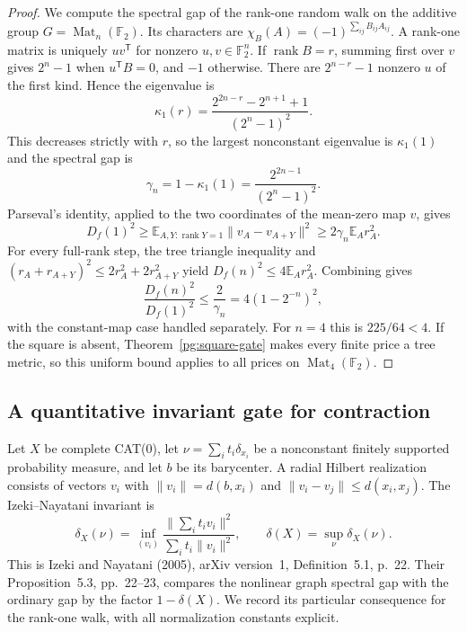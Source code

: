 \begin{proof}
We compute the spectral gap of the rank-one random walk on the additive
group $G=\operatorname{Mat}_n(\mathbb F_2)$. Its characters are
$\chi_B(A)=(-1)^{\sum_{ij}B_{ij}A_{ij}}$. A rank-one matrix is uniquely
$uv^{\mathsf T}$ for nonzero $u,v\in\mathbb F_2^n$. If
$\operatorname{rank}B=r$, summing first over $v$ gives $2^n-1$ when
$u^{\mathsf T}B=0$, and $-1$ otherwise. There are
$2^{n-r}-1$ nonzero $u$ of the first kind. Hence the eigenvalue is
\[
 \kappa_1(r)
 =\frac{2^{2n-r}-2^{n+1}+1}{(2^n-1)^2}.
\]
This decreases strictly with $r$, so the largest nonconstant eigenvalue
is $\kappa_1(1)$ and the spectral gap is
\[
 \gamma_n=1-\kappa_1(1)
 =\frac{2^{2n-1}}{(2^n-1)^2}.
\]
Parseval's identity, applied to the two coordinates of the mean-zero map
$v$, gives
\[
 D_f(1)^2\geq\mathbb E_{A,Y:\operatorname{rank}Y=1}
 \|v_A-v_{A+Y}\|^2
 \geq2\gamma_n\mathbb E_A r_A^2.
\]
For every full-rank step, the tree triangle inequality and
$(r_A+r_{A+Y})^2\leq2r_A^2+2r_{A+Y}^2$ yield
$D_f(n)^2\leq4\mathbb E_A r_A^2$. Combining gives
\[
 \frac{D_f(n)^2}{D_f(1)^2}
 \leq\frac{2}{\gamma_n}
 =4(1-2^{-n})^2,
\]
with the constant-map case handled separately. For $n=4$ this is
$225/64<4$. If the square is absent, Theorem~\ref{pg:square-gate}
makes every finite price a tree metric, so this uniform bound applies to
all prices on $\operatorname{Mat}_4(\mathbb F_2)$.
\end{proof}

\subsection{A quantitative invariant gate for contraction}

Let $X$ be complete CAT(0), let $\nu=\sum_i t_i\delta_{x_i}$ be a
nonconstant finitely supported probability measure, and let $b$ be its
barycenter. A radial Hilbert realization consists of vectors $v_i$ with
$\|v_i\|=d(b,x_i)$ and $\|v_i-v_j\|\leq d(x_i,x_j)$. The
Izeki--Nayatani invariant is
\[
 \delta_X(\nu)=\inf_{(v_i)}
 \frac{\|\sum_i t_i v_i\|^2}{\sum_i t_i\|v_i\|^2},
 \qquad \delta(X)=\sup_\nu\delta_X(\nu).
\]
This is Izeki and Nayatani (2005), arXiv version~1,
Definition~5.1, p.~22. Their Proposition~5.3, pp.~22--23,
compares the nonlinear graph spectral gap with the ordinary gap by the
factor $1-\delta(X)$. We record its particular consequence for the
rank-one walk, with all normalization constants explicit.

